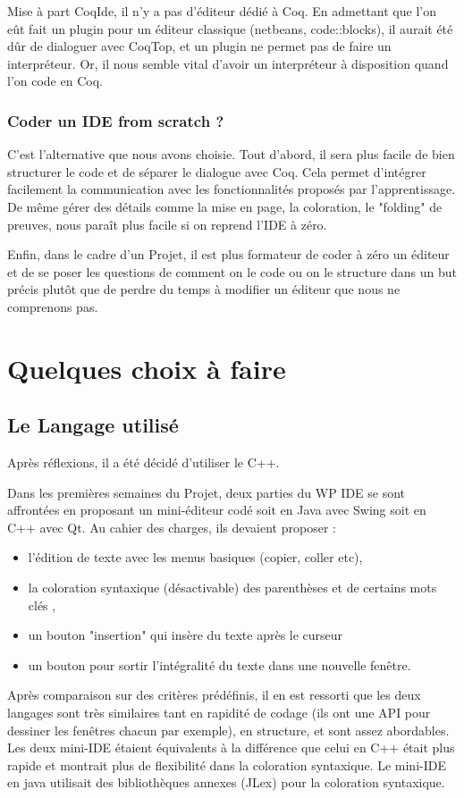 			Mise à part CoqIde, il n'y a pas d'éditeur dédié à Coq. En admettant que l'on eût fait un plugin pour un éditeur classique (netbeans, code::blocks), il aurait été dûr de dialoguer avec CoqTop, et un plugin ne permet pas de faire un interpréteur. Or, il nous semble vital d'avoir un interpréteur à disposition quand l'on code en Coq.
			
        \subsubsection{Coder un IDE from scratch ?}
        
			C'est l'alternative que nous avons choisie. 
			Tout d'abord, il sera plus facile de bien structurer le code et de séparer le dialogue avec Coq. 
			Cela permet d'intégrer facilement la communication avec les fonctionnalités proposés par l'apprentissage.
			De même gérer des détails comme la mise en page, la coloration, le "folding" de preuves, nous paraît plus facile si on reprend l'IDE à zéro.
			
			Enfin, dans le cadre d'un Projet, il est plus formateur de coder à zéro un éditeur et de se poser les questions de comment on le code ou on le structure dans un but précis plutôt que de perdre du temps à modifier un éditeur que nous ne comprenons pas.

\section{Quelques choix à faire}

    \subsection{Le Langage utilisé}
    
		Après réflexions, il a été décidé d'utiliser le C++.
		
		Dans les premières semaines du Projet, deux parties du WP IDE se sont affrontées en proposant un mini-éditeur codé soit en Java avec Swing soit en C++ avec Qt. 
		Au cahier des charges, ils devaient proposer : 
		\begin{itemize}
			\item l'édition de texte avec les menus basiques (copier, coller etc), 
			\item la coloration syntaxique (désactivable) des parenthèses et de certains mots clés , 
			\item un bouton "insertion" qui insère du texte après le curseur 
			\item un bouton pour sortir l'intégralité du texte dans une nouvelle fenêtre.
		\end{itemize}
		Après comparaison sur des critères prédéfinis, il en est ressorti que les deux langages sont très similaires tant en rapidité de codage (ils ont une API pour dessiner les fenêtres chacun par exemple), en structure, et sont assez abordables.
		Les deux mini-IDE étaient équivalents à la différence que celui en C++ était plus rapide et montrait plus de flexibilité dans la coloration syntaxique. Le mini-IDE en java utilisait des bibliothèques annexes (JLex) pour la coloration syntaxique.
		
